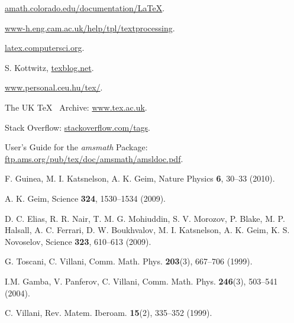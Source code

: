 \documentclass[myclassdoc,debug]{rjparticle}
\begin{document}
\begin{thebibliography}{99}
 \href{http://amath.colorado.edu/documentation/LaTeX}{\small\ttfamily amath.colorado.edu/documentation/LaTeX}.

 \href{http://www-h.eng.cam.ac.uk/help/tpl/textprocessing/}{\small\ttfamily www-h.eng.cam.ac.uk/help/tpl/textprocessing}.

 \href{http://latex.computersci.org/}{\small\ttfamily latex.computersci.org}.

 S. Kottwitz, \href{http://texblog.net/}{\small\ttfamily texblog.net}.

 \href{http://www.personal.ceu.hu/tex/}{\small\ttfamily www.personal.ceu.hu/tex/}.

 The UK \TeX~ Archive: \href{http://www.tex.ac.uk/}{\small\ttfamily www.tex.ac.uk}.

 Stack Overflow: \href{http://stackoverflow.com/tags}{\small\ttfamily stackoverflow.com/tags}.

 User's Guide for the \textit{amsmath} Package: \href{ftp://ftp.ams.org/pub/tex/doc/amsmath/amsldoc.pdf}{\small\ttfamily ftp.ams.org/pub/tex/doc/amsmath/amsldoc.pdf}.

F. Guinea, M. I. Katsnelson, A. K. Geim, Nature Physics \textbf{6}, 30--33 (2010).

A. K. Geim, Science \textbf{324}, 1530--1534 (2009).

D. C. Elias, R. R. Nair, T. M. G. Mohiuddin, S. V. Morozov, P. Blake, M. P. Halsall, A. C. Ferrari, D. W. Boukhvalov, M. I. Katsnelson, A. K. Geim, K. S. Novoselov, Science \textbf{323}, 610--613 (2009).

G. Toscani, C. Villani, Comm. Math. Phys. \textbf{203}(3), 667--706 (1999).

I.M. Gamba, V. Panferov, C. Villani, Comm. Math. Phys. \textbf{246}(3), 503--541 (2004).

C. Villani, Rev. Matem. Iberoam. \textbf{15}(2), 335--352 (1999).

\end{thebibliography}
\end{document}
